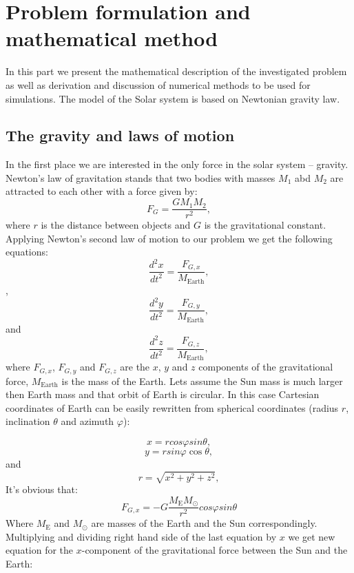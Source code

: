 \documentclass[10pt]{article}
\begin{document}
 

\newpage
\section{Problem formulation and mathematical method}\label{Part1}
In this part we present the mathematical description of the investigated problem as well as derivation and discussion of numerical methods to be used for simulations. The model of the Solar system is based on Newtonian gravity law. 

\subsection{The gravity and laws of motion}
In the first place we are interested in  the only force in the solar system  -- gravity. Newton's law of gravitation stands that two bodies with masses $M_1$ abd $M_2$ are attracted to each other with a force given by:
\[
F_G=\frac{GM_{1}M_{2}}{r^2},
\]
where $r$ is the distance between objects and $G$ is the gravitational constant.
Applying  Newton's second law of motion to our problem we get the following equations:
\[
\frac{d^2x}{dt^2}=\frac{F_{G,x}}{M_{\mathrm{Earth}}},
\]
, 
\[
\frac{d^2y}{dt^2}=\frac{F_{G,y}}{M_{\mathrm{Earth}}},
\]
and
\[
\frac{d^2z}{dt^2}=\frac{F_{G,z}}{M_{\mathrm{Earth}}},
\]
where $F_{G,x}$, $F_{G,y}$ and $F_{G,z}$ are the $x$, $y$ and $z$ components of the gravitational force, $M_{\mathrm{Earth}}$ is the mass of the Earth.
Lets assume the Sun mass is much larger then Earth mass and that orbit of Earth is circular. In this case Cartesian coordinates of Earth can be easily rewritten from spherical coordinates (radius $r$, inclination $\theta$ and azimuth $\varphi$):

\[
x=r cos\varphi sin\theta,
\]
\[
y=r sin\varphi\cos\theta,
\]
and
\[
r=\sqrt{x^2+y^2+z^2},
\]
It's obvious that:
\[
{F_{G,x}}=-G\frac{M_{\mathrm{E}}M_{\odot}}{r^2}cos\varphi sin\theta
\]
Where $M_{\mathrm{E}}$ and $M_{\odot}$ are masses of the Earth and the Sun correspondingly. Multiplying and dividing right hand side of the last equation by $x$ we get new equation for the $x$-component of the gravitational force between the Sun and the Earth:
\end{document}
